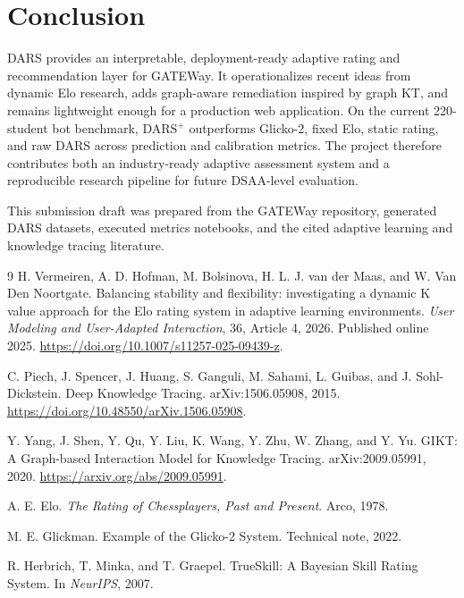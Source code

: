 \documentclass[sigconf,nonacm]{acmart}
\begin{document}
\section{Conclusion}
DARS provides an interpretable, deployment-ready adaptive rating and recommendation layer for GATEWay. It operationalizes recent ideas from dynamic Elo research, adds graph-aware remediation inspired by graph KT, and remains lightweight enough for a production web application. On the current 220-student bot benchmark, DARS$^+$ outperforms Glicko-2, fixed Elo, static rating, and raw DARS across prediction and calibration metrics. The project therefore contributes both an industry-ready adaptive assessment system and a reproducible research pipeline for future DSAA-level evaluation.

\begin{acks}
This submission draft was prepared from the GATEWay repository, generated DARS datasets, executed metrics notebooks, and the cited adaptive learning and knowledge tracing literature.
\end{acks}

\begin{thebibliography}{9}
H. Vermeiren, A. D. Hofman, M. Bolsinova, H. L. J. van der Maas, and W. Van Den Noortgate.
\newblock Balancing stability and flexibility: investigating a dynamic K value approach for the Elo rating system in adaptive learning environments.
\newblock \emph{User Modeling and User-Adapted Interaction}, 36, Article 4, 2026. Published online 2025.
\newblock \url{https://doi.org/10.1007/s11257-025-09439-z}.

C. Piech, J. Spencer, J. Huang, S. Ganguli, M. Sahami, L. Guibas, and J. Sohl-Dickstein.
\newblock Deep Knowledge Tracing.
\newblock arXiv:1506.05908, 2015.
\newblock \url{https://doi.org/10.48550/arXiv.1506.05908}.

Y. Yang, J. Shen, Y. Qu, Y. Liu, K. Wang, Y. Zhu, W. Zhang, and Y. Yu.
\newblock GIKT: A Graph-based Interaction Model for Knowledge Tracing.
\newblock arXiv:2009.05991, 2020.
\newblock \url{https://arxiv.org/abs/2009.05991}.

A. E. Elo.
\newblock \emph{The Rating of Chessplayers, Past and Present}.
\newblock Arco, 1978.

M. E. Glickman.
\newblock Example of the Glicko-2 System.
\newblock Technical note, 2022.

R. Herbrich, T. Minka, and T. Graepel.
\newblock TrueSkill: A Bayesian Skill Rating System.
\newblock In \emph{NeurIPS}, 2007.
\end{thebibliography}
\end{document}
